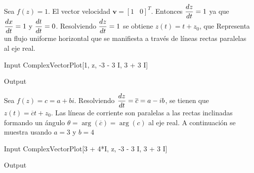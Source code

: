 \begin{Ejem}
	Sea $f(z)=1$. El vector velocidad $\textbf{v}=[1\;\;\;0]^{T}$. Entonces $\dfrac{dz}{dt}=1$ ya que $\dfrac{dx}{dt}=1$ y $\dfrac{dt}{dt}=0$. Resolviendo $\dfrac{dz}{dt}=1$ se obtiene $z(t)=t+z_0$, que Representa un flujo uniforme horizontal que se manifiesta a través de líneas rectas paralelas al eje real.\endproof
	\begin{mmaCell}{Input}
		ComplexVectorPlot[1, {z, -3 - 3 I, 3 + 3 I}]
	\end{mmaCell}
	\begin{mmaCell}[moregraphics={moreig={scale=0.3}}]{Output}
	\end{mmaCell}
\end{Ejem}
\begin{Ejem}
	Sea $f(z)=c=a+bi$. Resolviendo $\dfrac{dz}{dt}=\overline{c}=a-ib$, se tienen que $z(t)=\overline{c}t+z_0$. Las líneas de corriente son paralelas a las rectas inclinadas formando un ángulo $\theta=\operatorname{arg}(\overline{c})=\operatorname{arg}(c)$ al eje real. A continuación se muestra usando $a=3$ y $b=4$
	\begin{mmaCell}{Input}
		ComplexVectorPlot[3 + 4*I, {z, -3 - 3 I, 3 + 3 I}]
	\end{mmaCell}
	\begin{mmaCell}[moregraphics={moreig={scale=0.3}}]{Output}
	\end{mmaCell}
\end{Ejem}


